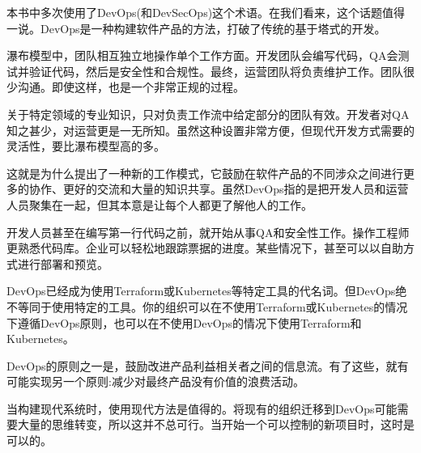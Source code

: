 本书中多次使用了DevOps(和DevSecOps)这个术语。在我们看来，这个话题值得一说。DevOps是一种构建软件产品的方法，打破了传统的基于塔式的开发。

瀑布模型中，团队相互独立地操作单个工作方面。开发团队会编写代码，QA会测试并验证代码，然后是安全性和合规性。最终，运营团队将负责维护工作。团队很少沟通。即使这样，也是一个非常正规的过程。

关于特定领域的专业知识，只对负责工作流中给定部分的团队有效。开发者对QA知之甚少，对运营更是一无所知。虽然这种设置非常方便，但现代开发方式需要的灵活性，要比瀑布模型高的多。

这就是为什么提出了一种新的工作模式，它鼓励在软件产品的不同涉众之间进行更多的协作、更好的交流和大量的知识共享。虽然DevOps指的是把开发人员和运营人员聚集在一起，但其本意是让每个人都更了解他人的工作。

开发人员甚至在编写第一行代码之前，就开始从事QA和安全性工作。操作工程师更熟悉代码库。企业可以轻松地跟踪票据的进度。某些情况下，甚至可以以自助方式进行部署和预览。

DevOps已经成为使用Terraform或Kubernetes等特定工具的代名词。但DevOps绝不等同于使用特定的工具。你的组织可以在不使用Terraform或Kubernetes的情况下遵循DevOps原则，也可以在不使用DevOps的情况下使用Terraform和Kubernetes。

DevOps的原则之一是，鼓励改进产品利益相关者之间的信息流。有了这些，就有可能实现另一个原则:减少对最终产品没有价值的浪费活动。

当构建现代系统时，使用现代方法是值得的。将现有的组织迁移到DevOps可能需要大量的思维转变，所以这并不总可行。当开始一个可以控制的新项目时，这时是可以的。
